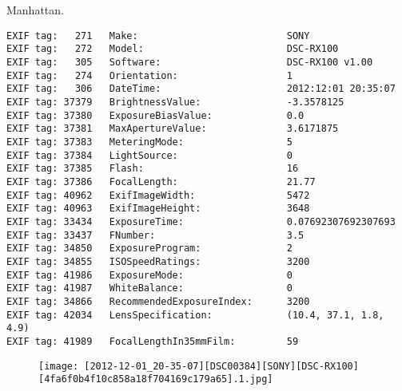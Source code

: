 \section{\protect{}}
\noindent Manhattan.
\noindent
\begin{lstlisting}
EXIF tag:   271   Make:                          SONY
EXIF tag:   272   Model:                         DSC-RX100
EXIF tag:   305   Software:                      DSC-RX100 v1.00
EXIF tag:   274   Orientation:                   1
EXIF tag:   306   DateTime:                      2012:12:01 20:35:07
EXIF tag: 37379   BrightnessValue:               -3.3578125
EXIF tag: 37380   ExposureBiasValue:             0.0
EXIF tag: 37381   MaxApertureValue:              3.6171875
EXIF tag: 37383   MeteringMode:                  5
EXIF tag: 37384   LightSource:                   0
EXIF tag: 37385   Flash:                         16
EXIF tag: 37386   FocalLength:                   21.77
EXIF tag: 40962   ExifImageWidth:                5472
EXIF tag: 40963   ExifImageHeight:               3648
EXIF tag: 33434   ExposureTime:                  0.07692307692307693
EXIF tag: 33437   FNumber:                       3.5
EXIF tag: 34850   ExposureProgram:               2
EXIF tag: 34855   ISOSpeedRatings:               3200
EXIF tag: 41986   ExposureMode:                  0
EXIF tag: 41987   WhiteBalance:                  0
EXIF tag: 34866   RecommendedExposureIndex:      3200
EXIF tag: 42034   LensSpecification:             (10.4, 37.1, 1.8, 4.9)
EXIF tag: 41989   FocalLengthIn35mmFilm:         59

\end{lstlisting}
\clearpage
\begin{figure}
\raggedleft
\texttt{[image: [2012-12-01\_20-35-07][DSC00384][SONY][DSC-RX100][4fa6f0b4f10c858a18f704169c179a65].1.jpg]}
\end{figure}


\clearpage
